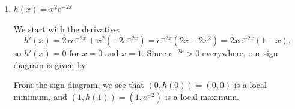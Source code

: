\documentclass[12pt]{article}
\begin{document}
\begin{enumerate}
\begin{enumerate}
\item $h(x) = x^2e^{-2x}$

We start with the derivative:
\[
h'(x) = 2xe^{-2x}+x^2(-2e^{-2x})=e^{-2x}(2x-2x^2)=2xe^{-2x}(1-x),
\]
so $h'(x)=0$ for $x=0$ and $x=1$. Since $e^{-2x}>0$ everywhere, our sign diagram is given by
\begin{center}
\end{center}
From the sign diagram, we see that $(0,h(0))=(0,0)$ is a local minimum, and $(1,h(1))=(1,e^{-2})$ is a local maximum.
\end{enumerate}
\end{enumerate}
\end{document}
